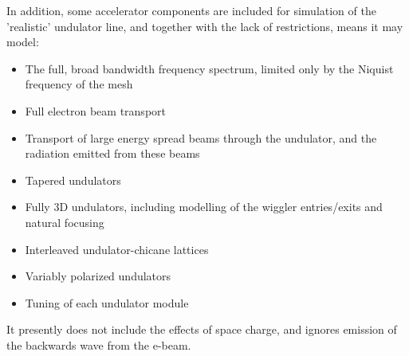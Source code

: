 \documentclass[12pt]{article}%
\begin{document}
In addition, some accelerator components are included for simulation of the 'realistic' undulator line, and together with the lack of restrictions, means it may model:

\begin{itemize}
\item The full, broad bandwidth frequency spectrum, limited only by the Niquist frequency of the mesh
\item Full electron beam transport
\item Transport of large energy spread beams through the undulator, and the radiation emitted from these beams
\item Tapered undulators
\item Fully 3D undulators, including modelling of the wiggler entries/exits and natural focusing
\item Interleaved undulator-chicane lattices
\item Variably polarized undulators
\item Tuning of each undulator module
\end{itemize}

It presently does not include the effects of space charge, and ignores emission of the backwards wave from the e-beam.
\end{document}

